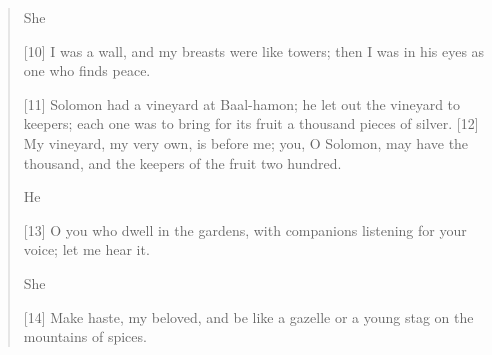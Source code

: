 \begin{quote}
    She

    [10] I was a wall,
        and my breasts were like towers;
    then I was in his eyes
        as one who finds peace.


    [11] Solomon had a vineyard at Baal-hamon;
        he let out the vineyard to keepers;
        each one was to bring for its fruit a thousand pieces of silver.
    [12] My vineyard, my very own, is before me;
        you, O Solomon, may have the thousand,
        and the keepers of the fruit two hundred.


    He

    [13] O you who dwell in the gardens,
        with companions listening for your voice;
        let me hear it.


    She

    [14] Make haste, my beloved,
        and be like a gazelle
    or a young stag
        on the mountains of spices.
  \end{quote}

